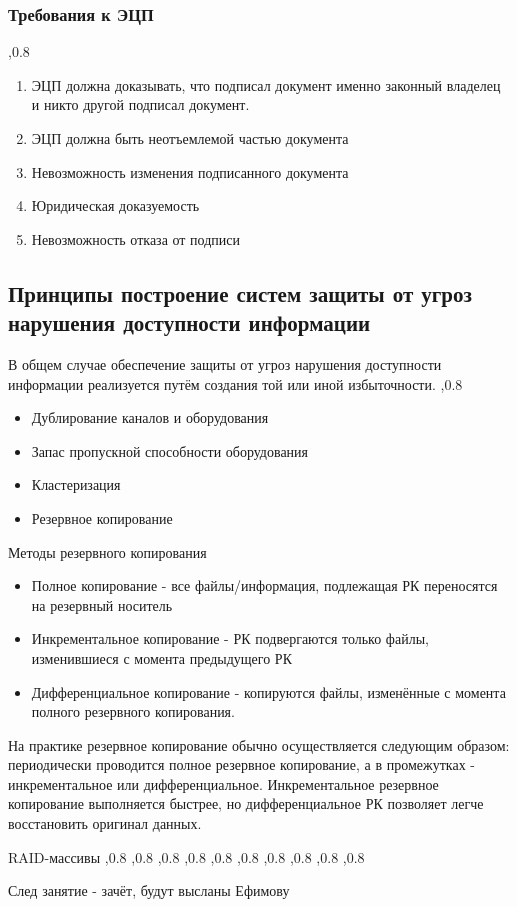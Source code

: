 \documentclass[a4paper,12pt]{report}
\begin{document}
	\subsubsection{Требования к ЭЦП}
	,0.8
		\begin{enumerate}
			\item	ЭЦП должна доказывать, что подписал документ именно законный владелец и никто другой подписал документ.
			\item	ЭЦП должна быть неотъемлемой частью документа
			\item	Невозможность изменения подписанного документа
			\item	Юридическая доказуемость
			\item	Невозможность отказа от подписи
		\end{enumerate}
	
	\subsection{Принципы построение систем защиты от угроз нарушения доступности информации}
	В общем случае обеспечение защиты от угроз нарушения доступности информации реализуется путём создания той или иной избыточности.	
	,0.8

	\begin{itemize}
		\item	Дублирование каналов и оборудования
		\item	Запас пропускной способности оборудования
		\item	Кластеризация
		\item	Резервное копирование
	\end{itemize}
	
	Методы резервного копирования
	\begin{itemize}
		\item	Полное копирование - все файлы/информация, подлежащая РК переносятся на резервный носитель
		\item	Инкрементальное копирование - РК подвергаются только файлы, изменившиеся с момента предыдущего РК
		\item	Дифференциальное копирование - копируются файлы, изменённые с момента полного резервного копирования.
	\end{itemize}
	
	На практике резервное копирование обычно осуществляется следующим образом: периодически проводится полное резервное копирование, а в промежутках -  инкрементальное или дифференциальное. Инкрементальное резервное копирование выполняется быстрее, но дифференциальное РК позволяет легче восстановить оригинал данных.

	RAID-массивы
	,0.8
	,0.8
	,0.8
	,0.8
	,0.8
	,0.8
	,0.8
	,0.8
	,0.8
	,0.8

	След занятие - зачёт, будут высланы Ефимову
\end{document}
